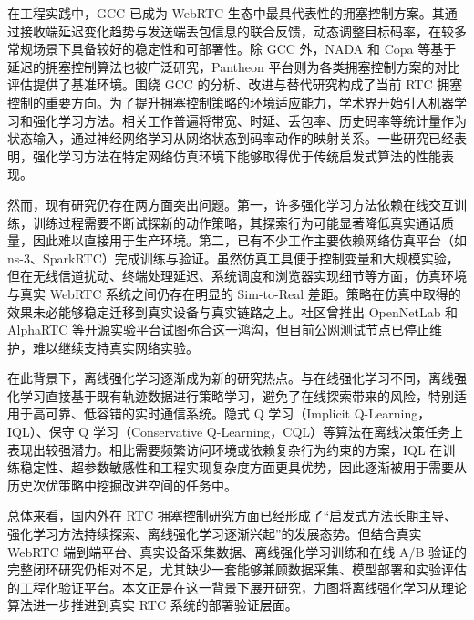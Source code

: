 \par 在工程实践中，GCC\cite{Carlucci2016GCC} 已成为 WebRTC 生态中最具代表性的拥塞控制方案。其通过接收端延迟变化趋势与发送端丢包信息的联合反馈，动态调整目标码率，在较多常规场景下具备较好的稳定性和可部署性。除 GCC 外，NADA\cite{Zhu2020NADA} 和 Copa\cite{Arun2018Copa} 等基于延迟的拥塞控制算法也被广泛研究，Pantheon\cite{Yan2018Pantheon} 平台则为各类拥塞控制方案的对比评估提供了基准环境。围绕 GCC 的分析、改进与替代研究构成了当前 RTC 拥塞控制的重要方向。为了提升拥塞控制策略的环境适应能力，学术界开始引入机器学习和强化学习方法\cite{Zhang2020OnRL,Zhang2021Loki,Bentaleb2023BoB}。相关工作普遍将带宽、时延、丢包率、历史码率等统计量作为状态输入，通过神经网络学习从网络状态到码率动作的映射关系。一些研究已经表明，强化学习方法在特定网络仿真环境下能够取得优于传统启发式算法的性能表现。
\par 然而，现有研究仍存在两方面突出问题。第一，许多强化学习方法依赖在线交互训练，训练过程需要不断试探新的动作策略，其探索行为可能显著降低真实通话质量，因此难以直接用于生产环境。第二，已有不少工作主要依赖网络仿真平台（如 ns-3\cite{Riley2010NS3}、SparkRTC\cite{SparkRTC2023}）完成训练与验证。虽然仿真工具便于控制变量和大规模实验，但在无线信道扰动、终端处理延迟、系统调度和浏览器实现细节等方面，仿真环境与真实 WebRTC 系统之间仍存在明显的 Sim-to-Real 差距\cite{Pinyoanuntapong2021SimToReal}。策略在仿真中取得的效果未必能够稳定迁移到真实设备与真实链路之上。社区曾推出 OpenNetLab\cite{Eo2022OpenNetLab} 和 AlphaRTC\cite{AlphaRTC2021} 等开源实验平台试图弥合这一鸿沟，但目前公网测试节点已停止维护，难以继续支持真实网络实验。
\par 在此背景下，离线强化学习逐渐成为新的研究热点。与在线强化学习不同，离线强化学习直接基于既有轨迹数据进行策略学习，避免了在线探索带来的风险，特别适用于高可靠、低容错的实时通信系统。隐式 Q 学习（Implicit Q-Learning，IQL）\cite{Kostrikov2021IQL}、保守 Q 学习（Conservative Q-Learning，CQL）\cite{Kumar2020CQL}等算法在离线决策任务上表现出较强潜力。相比需要频繁访问环境或依赖复杂行为约束的方案，IQL 在训练稳定性、超参数敏感性和工程实现复杂度方面更具优势，因此逐渐被用于需要从历史次优策略中挖掘改进空间的任务中\cite{Tan2024Accurate}。
\par 总体来看，国内外在 RTC 拥塞控制研究方面已经形成了“启发式方法长期主导、强化学习方法持续探索、离线强化学习逐渐兴起”的发展态势。但结合真实 WebRTC 端到端平台、真实设备采集数据、离线强化学习训练和在线 A/B 验证的完整闭环研究仍相对不足，尤其缺少一套能够兼顾数据采集、模型部署和实验评估的工程化验证平台。本文正是在这一背景下展开研究，力图将离线强化学习从理论算法进一步推进到真实 RTC 系统的部署验证层面。



